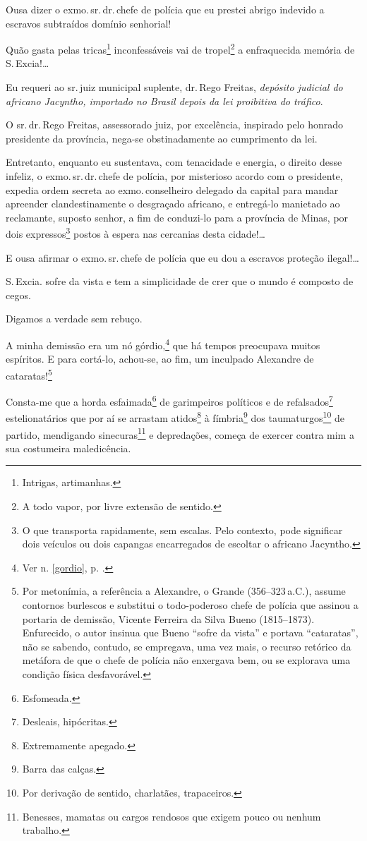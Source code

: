 Ousa dizer o exmo.\,sr.\,dr.\,chefe de polícia que eu prestei abrigo
indevido a escravos subtraídos domínio senhorial! %

Quão gasta pelas tricas\footnote{Intrigas, artimanhas.} inconfessáveis
vai de tropel\footnote{A todo vapor, por livre extensão de sentido.} a
enfraquecida memória de S.\,Excia!\ldots{}

Eu requeri ao sr.\,juiz municipal suplente, dr.\,Rego Freitas,
\emph{depósito judicial do africano Jacyntho, importado no Brasil depois
da lei proibitiva do tráfico}.

O sr.\,dr.\,Rego Freitas, assessorado juiz, por excelência, inspirado pelo
honrado presidente da província, nega-se obstinadamente ao cumprimento
da lei.

Entretanto, enquanto eu sustentava, com tenacidade e energia, o direito
desse infeliz, o exmo.\,sr.\,dr.\,chefe de polícia, por misterioso acordo
com o presidente, expedia ordem secreta ao exmo.\,conselheiro delegado da
capital para mandar apreender clandestinamente o desgraçado africano, e
entregá-lo manietado ao reclamante, suposto senhor, a fim de conduzi-lo
para a província de Minas, por dois expressos\footnote{O que
  transporta rapidamente, sem escalas. Pelo contexto, pode significar
  dois veículos ou dois capangas encarregados de escoltar o africano
  Jacyntho.} postos à espera nas cercanias desta cidade!\ldots{}

E ousa afirmar o exmo.\,sr.\,chefe de polícia que eu dou a escravos
proteção ilegal!\ldots{}

S.\,Excia. sofre da vista e tem a simplicidade de crer que o mundo é
composto de cegos.

Digamos a verdade sem rebuço.

A minha demissão era um nó górdio,\footnote{Ver n. \ref{gordio}, p. \pageref{gordio}.} 
que há tempos preocupava muitos espíritos. E para cortá-lo, achou-se, ao fim, 
um inculpado Alexandre de cataratas!\footnote{Por metonímia, a referência 
a Alexandre, o Grande (356--323\,a.C.), assume contornos burlescos e substitui 
o todo-poderoso chefe de polícia que assinou a portaria de demissão, Vicente 
Ferreira da Silva Bueno (1815--1873). Enfurecido, o autor insinua que Bueno
  ``sofre da vista'' e portava ``cataratas'', não se sabendo, contudo, se
  empregava, uma vez mais, o recurso retórico da metáfora de que o chefe
  de polícia não enxergava bem, ou se explorava uma condição física
  desfavorável.}

Consta-me que a horda esfaimada\footnote{Esfomeada.} de garimpeiros
políticos e de refalsados\footnote{Desleais, hipócritas.}
estelionatários que por aí se arrastam atidos\footnote{Extremamente
  apegado.} à fímbria\footnote{Barra das calças.} dos
taumaturgos\footnote{Por derivação de sentido, charlatães,
  trapaceiros.} de partido, mendigando sinecuras\footnote{Benesses,
  mamatas ou cargos rendosos que exigem pouco ou nenhum trabalho.} e
depredações, começa de exercer contra mim a sua costumeira maledicência.


